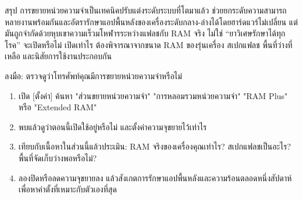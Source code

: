 \begin{tcbinfo}{สรุป}
การขยายหน่วยความจำเป็นเทคนิคปรับแต่งระดับระบบที่โตมาแล้ว ช่วยยกระดับความสามารถหลายงานพร้อมกันและอัตรารักษาแอปพื้นหลังของเครื่องระดับกลาง-ล่างได้โดยฮาร์ดแวร์ไม่เปลี่ยน แต่มันถูกจำกัดด้วยหุบเขาความเร็วมโหฬารระหว่างแฟลชกับ RAM จริง ไม่ใช่ “ยาวิเศษรักษาได้ทุกโรค” จะเปิดหรือไม่ เปิดเท่าไร ต้องพิจารณาจากขนาด RAM ของรุ่นเครื่อง สเปกแฟลช พื้นที่ว่างที่เหลือ และนิสัยการใช้งานประกอบกัน

\end{tcbinfo}

\begin{tcbpractice}{ลงมือ: ตรวจดูว่าโทรศัพท์คุณมีการขยายหน่วยความจำหรือไม่}
\begin{enumerate}
  \item เปิด [ตั้งค่า] ค้นหา "ส่วนขยายหน่วยความจำ" "การหลอมรวมหน่วยความจำ" "RAM Plus" หรือ "Extended RAM"
  \item พบแล้วดูว่าตอนนี้เปิดใช้อยู่หรือไม่ และตั้งค่าความจุขยายไว้เท่าไร
  \item เทียบกับเนื้อหาในส่วนนี้แล้วประเมิน: RAM จริงของเครื่องคุณเท่าไร? สเปกแฟลชเป็นอะไร? พื้นที่จัดเก็บว่างพอหรือไม่?
  \item ลองปิดหรือลดความจุขยายลง แล้วสังเกตการรักษาแอปพื้นหลังและความร้อนตลอดหนึ่งสัปดาห์ เพื่อหาค่าตั้งที่เหมาะกับตัวเองที่สุด
\end{enumerate}

\end{tcbpractice}
